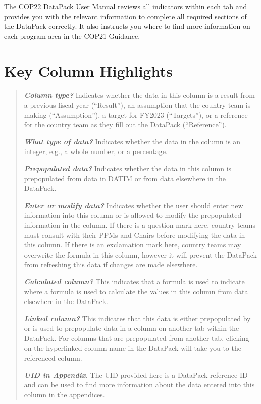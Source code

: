 \documentclass[
  openany]{book}
\begin{document}
The COP22 DataPack User Manual reviews all indicators within each tab
and provides you with the relevant information to complete all required
sections of the DataPack correctly. It also instructs you where to find
more information on each program area in the COP21 Guidance.

\hypertarget{key-column-highlights}{%
\section{Key Column Highlights}\label{key-column-highlights}}

\begin{quote}
\textbf{\emph{Column type?}} Indicates whether the data in this column is a
result from a previous fiscal year (``Result''), an assumption that the
country team is making (``Assumption''), a target for FY2023
(``Targets''), or a reference for the country team as they fill out the
DataPack (``Reference'').

\textbf{\emph{What type of data?}} Indicates whether the data in the column is
an integer, e.g., a whole number, or a percentage.

\textbf{\emph{Prepopulated data?}} Indicates whether the data in this column is
prepopulated from data in DATIM or from data elsewhere in the
DataPack.

\textbf{\emph{Enter or modify data?}} Indicates whether the user should enter
new information into this column or is allowed to modify the
prepopulated information in the column. If there is a question mark
here, country teams must consult with their PPMs and Chairs before
modifying the data in this column. If there is an exclamation mark
here, country teams may overwrite the formula in this column, however
it will prevent the DataPack from refreshing this data if changes are
made elsewhere.

\textbf{\emph{Calculated column?}} This indicates that a formula is used to
indicate where a formula is used to calculate the values in this
column from data elsewhere in the DataPack.

\textbf{\emph{Linked column?}} This indicates that this data is either
prepopulated by or is used to prepopulate data in a column on another
tab within the DataPack. For columns that are prepopulated from
another tab, clicking on the hyperlinked column name in the DataPack
will take you to the referenced column.

\emph{\textbf{UID in Appendix}.} The UID provided here is a DataPack reference
ID and can be used to find more information about the data entered
into this column in the appendices.
\end{quote}
\end{document}
